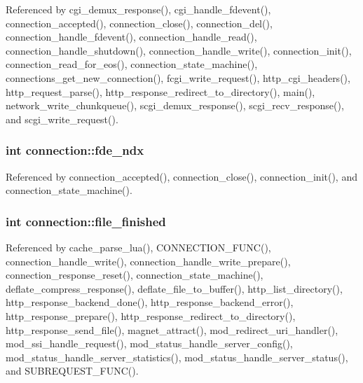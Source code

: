 Referenced by cgi\-\_\-demux\-\_\-response(), cgi\-\_\-handle\-\_\-fdevent(), connection\-\_\-accepted(), connection\-\_\-close(), connection\-\_\-del(), connection\-\_\-handle\-\_\-fdevent(), connection\-\_\-handle\-\_\-read(), connection\-\_\-handle\-\_\-shutdown(), connection\-\_\-handle\-\_\-write(), connection\-\_\-init(), connection\-\_\-read\-\_\-for\-\_\-eos(), connection\-\_\-state\-\_\-machine(), connections\-\_\-get\-\_\-new\-\_\-connection(), fcgi\-\_\-write\-\_\-request(), http\-\_\-cgi\-\_\-headers(), http\-\_\-request\-\_\-parse(), http\-\_\-response\-\_\-redirect\-\_\-to\-\_\-directory(), main(), network\-\_\-write\-\_\-chunkqueue(), scgi\-\_\-demux\-\_\-response(), scgi\-\_\-recv\-\_\-response(), and scgi\-\_\-write\-\_\-request().

\hypertarget{structconnection_a6d5f98c61e568390686dd9ec8f743c76}{
\subsubsection[{fde\-\_\-ndx}]{\setlength{\rightskip}{0pt plus 5cm}int connection\-::fde\-\_\-ndx}}\label{structconnection_a6d5f98c61e568390686dd9ec8f743c76}


Referenced by connection\-\_\-accepted(), connection\-\_\-close(), connection\-\_\-init(), and connection\-\_\-state\-\_\-machine().

\hypertarget{structconnection_acf4d9c3f706cf8bd97c5453a211bb42e}{
\subsubsection[{file\-\_\-finished}]{\setlength{\rightskip}{0pt plus 5cm}int connection\-::file\-\_\-finished}}\label{structconnection_acf4d9c3f706cf8bd97c5453a211bb42e}


Referenced by cache\-\_\-parse\-\_\-lua(), C\-O\-N\-N\-E\-C\-T\-I\-O\-N\-\_\-\-F\-U\-N\-C(), connection\-\_\-handle\-\_\-write(), connection\-\_\-handle\-\_\-write\-\_\-prepare(), connection\-\_\-response\-\_\-reset(), connection\-\_\-state\-\_\-machine(), deflate\-\_\-compress\-\_\-response(), deflate\-\_\-file\-\_\-to\-\_\-buffer(), http\-\_\-list\-\_\-directory(), http\-\_\-response\-\_\-backend\-\_\-done(), http\-\_\-response\-\_\-backend\-\_\-error(), http\-\_\-response\-\_\-prepare(), http\-\_\-response\-\_\-redirect\-\_\-to\-\_\-directory(), http\-\_\-response\-\_\-send\-\_\-file(), magnet\-\_\-attract(), mod\-\_\-redirect\-\_\-uri\-\_\-handler(), mod\-\_\-ssi\-\_\-handle\-\_\-request(), mod\-\_\-status\-\_\-handle\-\_\-server\-\_\-config(), mod\-\_\-status\-\_\-handle\-\_\-server\-\_\-statistics(), mod\-\_\-status\-\_\-handle\-\_\-server\-\_\-status(), and S\-U\-B\-R\-E\-Q\-U\-E\-S\-T\-\_\-\-F\-U\-N\-C().

